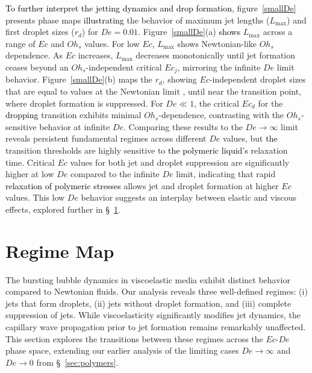 \documentclass{jfm}
\newcommand{\DL}[1]{{\textcolor{black}{#1}}}
\newcommand{\VS}[1]{{\textcolor{black}{#1}}}
\newcommand{\AO}[1]{{\textcolor{black}{#1}}}
\newcommand{\vsy}[1]{\todo[color=orange, bordercolor=none, textcolor=white]{Vatsal}\textcolor{orange}{#1}}
\newcommand{\oo}{\color{magenta} \normalfont}
\newcommand{\bb}{\color{black} \normalfont}
\begin{document}
\AO{To further interpret the jetting dynamics and drop formation}, figure~\ref{smallDe} presents phase maps \VS{illustrating} the behavior of maximum jet lengths ($L_{\text{max}}$) and first droplet sizes ($r_d$) for $De = 0.01$. Figure~\ref{smallDe}(a) \DL{shows} $L_{\text{max}}$ across a range of $Ec$ and $Oh_s$ values.
For low $Ec$, $L_{\text{max}}$ shows Newtonian-like $Oh_s$ dependence. As $Ec$ increases, $L_{\text{max}}$ decreases monotonically until jet formation ceases beyond an $Oh_s$-independent critical $Ec_j$, mirroring the infinite $De$ limit behavior.
Figure~\ref{smallDe}(b) maps the $r_d$, showing $Ec$-independent droplet sizes \oo that are equal to values at the Newtonian limit\bb, until near the transition point, where droplet formation is suppressed. For $De \ll 1$, the critical $Ec_d$ for the \VS{dropping} transition exhibits minimal $Oh_s$-dependence, contrasting with the $Oh_s$-sensitive behavior at infinite $De$.
Comparing these results to the $De \to \infty$ limit reveals persistent fundamental regimes across different $De$ values, but \DL{the} transition thresholds are highly sensitive to \DL{the polymeric liquid's} relaxation time. Critical $Ec$ values for both jet and droplet suppression are significantly higher at low $De$ compared to the infinite $De$ limit, indicating that rapid \DL{relaxation of polymeric stresses} allows jet and droplet formation at higher $Ec$ values. This low $De$ behavior suggests an interplay between elastic and viscous effects, explored further in \S~\ref{sec:regimes}.

\section{Regime Map}
\label{sec:regimes}


\oo
The bursting bubble dynamics in viscoelastic media exhibit distinct behavior compared to Newtonian fluids.
Our analysis reveals three well-defined regimes: (i) jets that form droplets, (ii) jets without droplet formation, and (iii) complete suppression of jets. While viscoelasticity significantly modifies jet dynamics, the capillary wave propagation prior to jet formation remains remarkably unaffected.
This section explores the transitions between these regimes across the $Ec$-$De$ phase space, extending our earlier analysis of the limiting cases $De \to \infty$ and $De \to 0$ from \S~\ref{sec:polymers}.
\bb
\end{document}
